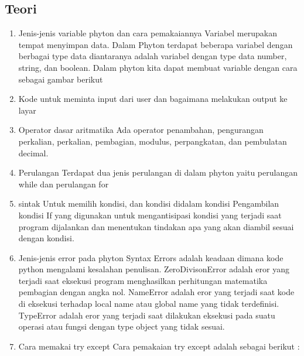 \subsection{Teori}
\begin{enumerate}
	\item Jenis-jenis variable phyton dan cara pemakaiannya
Variabel merupakan tempat menyimpan data. Dalam Phyton terdapat beberapa variabel dengan berbagai type data diantaranya adalah variabel dengan type data number, string, dan boolean. Dalam phyton kita dapat membuat variable dengan cara sebagai gambar berikut
   
	\item Kode untuk meminta input dari user dan bagaimana melakukan output ke layar
 
	\item Operator dasar aritmatika
Ada operator penambahan, pengurangan perkalian, perkalian, pembagian, modulus, perpangkatan, dan pembulatan decimal.

	\item Perulangan
Terdapat dua jenis perulangan di dalam phyton yaitu perulangan while dan perulangan for
 
 
	\item sintak Untuk memilih kondisi, dan kondisi didalam kondisi
Pengambilan kondisi If yang digunakan untuk mengantisipasi kondisi yang terjadi saat program dijalankan dan menentukan tindakan apa yang akan diambil sesuai dengan kondisi.
  
  
  

	\item Jenis-jenis error pada phyton
Syntax Errors adalah keadaan dimana kode python mengalami kesalahan penulisan. 
ZeroDivisonError adalah eror yang terjadi saat eksekusi program menghasilkan perhitungan matematika pembagian dengan angka nol.
NameError adalah eror yang terjadi saat kode di eksekusi terhadap local name atau global name yang tidak terdefinisi. 
TypeError adalah eror yang terjadi saat dilakukan eksekusi pada suatu operasi atau fungsi dengan type object yang tidak sesuai.

	\item Cara memakai try except
Cara pemakaian try except adalah sebagai berikut :


\end{enumerate}

